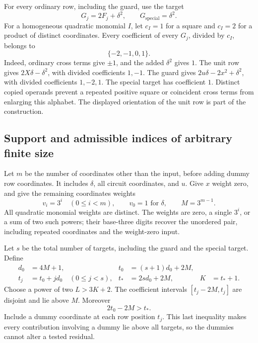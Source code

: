 For every ordinary row, including the guard, use the target
\begin{equation}\label{eq:four-targets}
 G_j=2F_j+\delta^2,
 \qquad G_{\mathrm{special}}=\delta^2.
\end{equation}
For a homogeneous quadratic monomial $I$, let $c_I=1$ for a square
and $c_I=2$ for a product of distinct coordinates. Every coefficient
of every $G_j$, divided by $c_I$, belongs to
\begin{equation}\label{eq:four-coefficient-alphabet}
 \{-2,-1,0,1\}.
\end{equation}
Indeed, ordinary cross terms give $\pm1$, and the added $\delta^2$
gives $1$. The unit row gives $2X\delta-\delta^2$, with divided
coefficients $1,-1$. The guard gives
$2u\delta-2x^2+\delta^2$, with divided coefficients $1,-2,1$.
The special target has coefficient $1$. Distinct copied operands
prevent a repeated positive square or coincident cross terms from
enlarging this alphabet. The displayed orientation of the unit row
is part of the construction.

\subsection{Support and admissible indices of arbitrary finite size}

Let $m$ be the number of coordinates other than the input, before
adding dummy row coordinates. It includes $\delta$, all circuit
coordinates, and $u$. Give $x$ weight zero, and give the remaining
coordinates weights
\[
 v_i=3^i\quad(0\le i<m),\qquad v_0=1\text{ for }\delta,
 \qquad M=3^{m-1}.
\]
All quadratic monomial weights are distinct. The weights are zero,
a single $3^i$, or a sum of two such powers; their base-three digits
recover the unordered pair, including repeated coordinates and the
weight-zero input.

Let $s$ be the total number of targets, including the guard and the
special target. Define
\begin{align*}
 d_0&=4M+1,& t_0&=(s+1)d_0+2M,\\
 t_j&=t_0+jd_0\quad(0\le j<s),&
 t_*&=2sd_0+2M,& K&=t_*+1.
\end{align*}
Choose a power of two $L>3K+2$. The coefficient intervals
$[t_j-2M,t_j]$ are disjoint and lie above $M$. Moreover
\[
 2t_0-2M>t_*.
\]
Include a dummy coordinate at each row position $t_j$. This last
inequality makes every contribution involving a dummy lie above all
targets, so the dummies cannot alter a tested residual.


